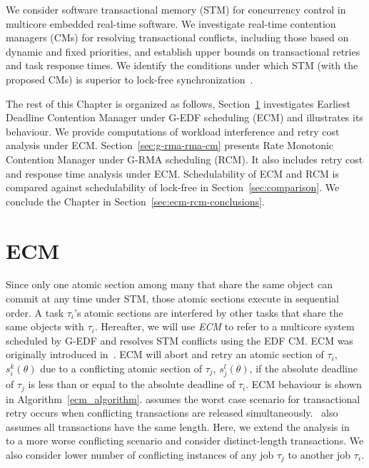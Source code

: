 \documentclass[12pt,english]{report}
\begin{document}
We consider software transactional memory (STM) for concurrency control in multicore embedded real-time software. We investigate real-time contention managers (CMs) for resolving transactional conflicts, including those based on dynamic and fixed priorities, and establish upper bounds on transactional retries and task response times. We identify the conditions under which STM (with the proposed CMs) is superior to lock-free synchronization~\cite{stmconcurrencycontrol:emsoft11}.

The rest of this Chapter is organized as follows, Section~\ref{sec:g-edf-edf-cm} investigates Earliest Deadline Contention Manager under G-EDF scheduling (ECM) and illustrates its behaviour. We provide computations of workload interference and retry cost analysis under ECM. Section~\ref{sec:g-rma-rma-cm} presents Rate Monotonic Contention Manager under G-RMA scheduling (RCM). It also includes retry cost and response time analysis under ECM. Schedulability of ECM and RCM is compared against schedulability of lock-free in Section~\ref{sec:comparison}. We conclude the Chapter in Section~\ref{sec:ecm-rcm-conclusions}.

\section{ECM}
\label{sec:g-edf-edf-cm}

Since only one atomic section among many that share the same object can commit at any time under STM, those atomic sections execute in sequential order.  A task $\tau_{i}$'s atomic sections are interfered by other tasks that share the same objects with $\tau_{i}$. Hereafter, we will use \emph{ECM} to refer to a multicore system scheduled by G-EDF and resolves STM conflicts using the EDF CM. ECM was originally introduced in~\cite{6045438}. ECM will abort and retry an atomic section of $\tau_i$, $s_i^k(\theta)$ due to a conflicting atomic section of $\tau_j$, $s_j^l(\theta)$, if the absolute deadline of $\tau_j$ is less than or equal to the absolute deadline of $\tau_i$. ECM behaviour is shown in Algorithm~\ref{ecm_algorithm}. \cite{6045438} assumes the worst case scenario for transactional retry occurs when conflicting transactions are released simultaneously.~\cite{6045438} also assumes all transactions have the same length. Here, we extend the analysis in~\cite{6045438} to a more worse conflicting scenario and consider distinct-length transactions. We also consider lower number of conflicting instances of any job $\tau_j$ to another job $\tau_i$.
\end{document}
